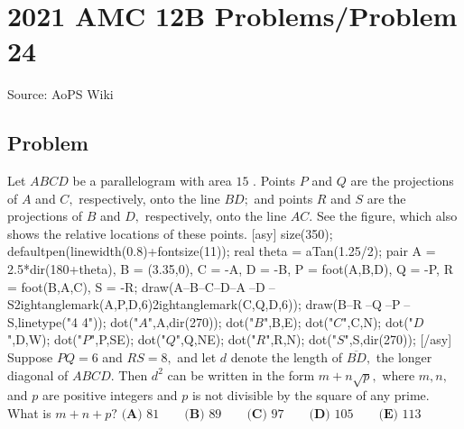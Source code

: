 \documentclass[12pt]{article}
\begin{document}
\section*{{2021 AMC 12B Problems/Problem 24}}
Source: AoPS Wiki

\subsection*{Problem}
Let $ABCD$ be a parallelogram with area $15$ . Points $P$ and $Q$ are the projections of $A$ and $C,$ respectively, onto the line $BD;$ and points $R$ and $S$ are the projections of $B$ and $D,$ respectively, onto the line $AC.$ See the figure, which also shows the relative locations of these points. [asy] size(350); defaultpen(linewidth(0.8)+fontsize(11)); real theta = aTan(1.25/2); pair A = 2.5*dir(180+theta), B = (3.35,0), C = -A, D = -B, P = foot(A,B,D), Q = -P, R = foot(B,A,C), S = -R; draw(A--B--C--D--A^^B--D^^R--S^^rightanglemark(A,P,D,6)^^rightanglemark(C,Q,D,6)); draw(B--R^^C--Q^^A--P^^D--S,linetype("4 4")); dot("$A$",A,dir(270)); dot("$B$",B,E); dot("$C$",C,N); dot("$D$",D,W); dot("$P$",P,SE); dot("$Q$",Q,NE); dot("$R$",R,N); dot("$S$",S,dir(270)); [/asy] Suppose $PQ=6$ and $RS=8,$ and let $d$ denote the length of $\overline{BD},$ the longer diagonal of $ABCD.$ Then $d^2$ can be written in the form $m+n\sqrt p,$ where $m,n,$ and $p$ are positive integers and $p$ is not divisible by the square of any prime. What is $m+n+p?$ $\textbf{(A) }81 \qquad \textbf{(B) }89 \qquad \textbf{(C) }97\qquad \textbf{(D) }105 \qquad \textbf{(E) }113$
\end{document}
